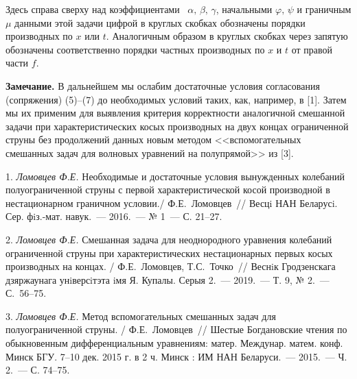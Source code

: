  Здесь справа сверху над коэффициентами ~$\alpha,\, \beta,\, \gamma$, начальными $\varphi,\,\psi$
и граничным $\mu$ данными этой задачи цифрой в круглых скобках
обозначены порядки производных по $x$ или $t$. Аналогичным образом
в круглых скобках через запятую обозначены соответственно порядки
частных производных по $x$ и $t$ от правой части $f$.

{\bf Замечание.} В дальнейшем мы ослабим достаточные условия
согласования (сопряжения) (5)--(7) до необходимых условий таких,
как, например, в [1]. Затем мы их применим для выявления критерия
корректности аналогичной смешанной задачи при характеристических
косых производных на двух концах ограниченной струны без
продолжений данных новым методом <<вспомогательных смешанных задач
для волновых уравнений на полупрямой>> из [3].

\litlist

1. \textit{Ломовцев Ф.Е.} {Необходимые и достаточные условия
вынужденных колебаний полуограниченной струны с первой
характеристической косой производной в нестационарном граничном
условии./ Ф.Е.~Ломовцев~// Весцi НАН Беларусi. Сер. фiз.-мат.
навук.~--- 2016.~--- № 1~--- С. 21--27.}


2. \textit{Ломовцев Ф.Е.} {Смешанная задача для неоднородного
уравнения колебаний ограниченной струны при характеристических
нестационарных первых косых производных на концах. /
Ф.Е.~Ломовцев, Т.С.~Точко~// Веснiк Гродзенскага дзяржаунага
унiверсiтэта iмя Я. Купалы. Серыя 2.~--- 2019.~--- Т. 9, № 2.~---
С.~56--75.}


3. \textit{Ломовцев Ф.Е.} {Метод вспомогательных смешанных задач
для полуограниченной струны. / Ф.Е.~Ломовцев~// Шестые
Богдановские чтения по обыкновенным дифференциальным уравнениям:
матер. Междунар. матем. конф. Минск БГУ. 7--10 дек. 2015 г. в 2 ч.
Минск : ИМ НАН Беларуси.~--- 2015.~--- Ч. 2.~--- С. 74--75.}
